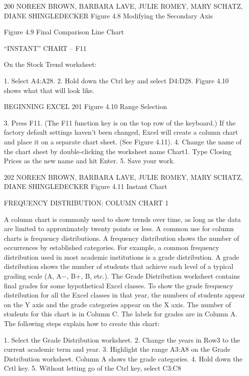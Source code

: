 200 NOREEN BROWN, BARBARA LAVE, JULIE ROMEY, MARY SCHATZ, DIANE SHINGLEDECKER
Figure 4.8 Modifying the Secondary Axis




Figure 4.9 Final Comparison Line Chart


“INSTANT” CHART – F11

On the Stock Trend worksheet:

1. Select A4:A28.
2. Hold down the Ctrl key and select D4:D28. Figure 4.10 shows what that will look like.



BEGINNING EXCEL 201
Figure 4.10 Range Selection


3. Press F11. (The F11 function key is on the top row of the keyboard.) If the factory default
settings haven’t been changed, Excel will create a column chart and place it on a separate chart
sheet. (See Figure 4.11).
4. Change the name of the chart sheet by double-clicking the worksheet name Chart1. Type
Closing Prices as the new name and hit Enter.
5. Save your work.




202 NOREEN BROWN, BARBARA LAVE, JULIE ROMEY, MARY SCHATZ, DIANE SHINGLEDECKER
Figure 4.11 Instant Chart


FREQUENCY DISTRIBUTION: COLUMN CHART 1

A column chart is commonly used to show trends over time, as long as the data are limited to
approximately twenty points or less. A common use for column charts is frequency distributions. A
frequency distribution shows the number of occurrences by established categories. For example, a
common frequency distribution used in most academic institutions is a grade distribution. A grade
distribution shows the number of students that achieve each level of a typical grading scale (A, A−, B+,
B, etc.). The Grade Distribution worksheet contains final grades for some hypothetical Excel classes.
To show the grade frequency distribution for all the Excel classes in that year, the numbers of students
appear on the Y axis and the grade categories appear on the X axis. The number of students for this
chart is in Column C. The labels for grades are in Column A. The following steps explain how to
create this chart:

1. Select the Grade Distribution worksheet.
2. Change the years in Row3 to the current academic term and year.
3. Highlight the range A3:A8 on the Grade Distribution worksheet. Column A shows the grade
categories.
4. Hold down the Crtl key.
5. Without letting go of the Ctrl key, select C3:C8

